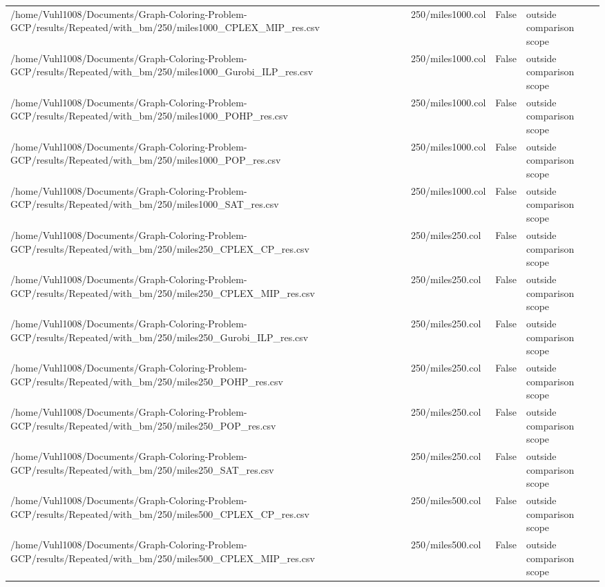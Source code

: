 \begin{table}[htbp]
\begin{tabular}{llll}
/home/Vuhl1008/Documents/Graph-Coloring-Problem-GCP/results/Repeated/with\_bm/250/miles1000\_CPLEX\_MIP\_res.csv & 250/miles1000.col & False & outside comparison scope \\
/home/Vuhl1008/Documents/Graph-Coloring-Problem-GCP/results/Repeated/with\_bm/250/miles1000\_Gurobi\_ILP\_res.csv & 250/miles1000.col & False & outside comparison scope \\
/home/Vuhl1008/Documents/Graph-Coloring-Problem-GCP/results/Repeated/with\_bm/250/miles1000\_POHP\_res.csv & 250/miles1000.col & False & outside comparison scope \\
/home/Vuhl1008/Documents/Graph-Coloring-Problem-GCP/results/Repeated/with\_bm/250/miles1000\_POP\_res.csv & 250/miles1000.col & False & outside comparison scope \\
/home/Vuhl1008/Documents/Graph-Coloring-Problem-GCP/results/Repeated/with\_bm/250/miles1000\_SAT\_res.csv & 250/miles1000.col & False & outside comparison scope \\
/home/Vuhl1008/Documents/Graph-Coloring-Problem-GCP/results/Repeated/with\_bm/250/miles250\_CPLEX\_CP\_res.csv & 250/miles250.col & False & outside comparison scope \\
/home/Vuhl1008/Documents/Graph-Coloring-Problem-GCP/results/Repeated/with\_bm/250/miles250\_CPLEX\_MIP\_res.csv & 250/miles250.col & False & outside comparison scope \\
/home/Vuhl1008/Documents/Graph-Coloring-Problem-GCP/results/Repeated/with\_bm/250/miles250\_Gurobi\_ILP\_res.csv & 250/miles250.col & False & outside comparison scope \\
/home/Vuhl1008/Documents/Graph-Coloring-Problem-GCP/results/Repeated/with\_bm/250/miles250\_POHP\_res.csv & 250/miles250.col & False & outside comparison scope \\
/home/Vuhl1008/Documents/Graph-Coloring-Problem-GCP/results/Repeated/with\_bm/250/miles250\_POP\_res.csv & 250/miles250.col & False & outside comparison scope \\
/home/Vuhl1008/Documents/Graph-Coloring-Problem-GCP/results/Repeated/with\_bm/250/miles250\_SAT\_res.csv & 250/miles250.col & False & outside comparison scope \\
/home/Vuhl1008/Documents/Graph-Coloring-Problem-GCP/results/Repeated/with\_bm/250/miles500\_CPLEX\_CP\_res.csv & 250/miles500.col & False & outside comparison scope \\
/home/Vuhl1008/Documents/Graph-Coloring-Problem-GCP/results/Repeated/with\_bm/250/miles500\_CPLEX\_MIP\_res.csv & 250/miles500.col & False & outside comparison scope \\

\end{tabular}
\end{table}
